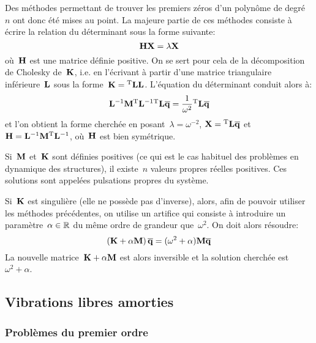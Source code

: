 \medskip{}
Des méthodes permettant de trouver les premiers zéros d'un polynôme de degré~$n$ ont donc été mises au point. La majeure partie de ces méthodes consiste à écrire la relation du déterminant sous la forme suivante:
\begin{equation} \MM{H}\VV{X}=\lambda\VV{X} \end{equation}
où~$\MM{H}$ est une matrice définie positive.
\medskipvm
On se sert pour cela de la décomposition de Cholesky de~$\MM{K}$, i.e. en l'écrivant à partir d'une matrice triangulaire inférieure~$\MM{L}$ sous la forme~$\MM{K}=\MMT{L}\MM{L}$.
\medskipvm
L'équation du déterminant conduit alors à:
\begin{equation} \MMI{L}\MM{M}\MMIT{L}\MMT{L}\VV{\overline{q}}=\frac1{\omega^2}\MMT{L}\VV{\overline{q}} \end{equation}
et l'on obtient la forme cherchée en posant~$\lambda=\omega^{-2}$, $\VV{X}=\MMT{L}\VV{\overline{q}}$
et~$\MM{H}=\MMI{L}\MM{M}\MMIT{L}$, où~$\MM{H}$ est bien symétrique.

\medskip
{}
Si~$\MM{M}$ et~$\MM{K}$ sont définies positives (ce qui est le cas habituel des problèmes en dynamique des structures), il existe~$n$ valeurs propres réelles positives. Ces solutions sont appelées pulsations propres du système.

Si~$\MM{K}$ est singulière (elle ne possède pas d'inverse), alors, afin de pouvoir utiliser les méthodes précédentes, on utilise un artifice qui consiste à introduire un paramètre~$\alpha\in\mathbb R$ du même ordre de grandeur que~$\omega^2$. On doit alors résoudre:
\begin{equation}\left(\MM{K}+\alpha \MM{M}\right)\VV{\overline{q}} = (\omega^2+\alpha)\MM{M} \VV{\overline{q}}\end{equation}
La nouvelle matrice~$\MM{K}+\alpha \MM{M}$ est alors inversible et la solution cherchée est~$\omega^2+\alpha$.

\medskip
\subsection{Vibrations libres amorties}

\subsubsection{Problèmes du premier ordre}

